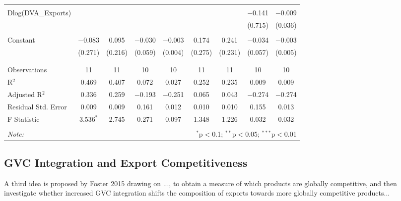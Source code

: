 \documentclass[a4paper]{article}
\begin{document}
\begin{table}[!htbp]
{\begin{tabular}{@{\extracolsep{5pt}}lcccccccc}
  & & & & & & & & \\ 
 Dlog(DVA\_Exports) &  &  &  &  &  &  & $-$0.141 & $-$0.009 \\ 
  &  &  &  &  &  &  & (0.715) & (0.036) \\ 
  & & & & & & & & \\ 
 Constant & $-$0.083 & 0.095 & $-$0.030 & $-$0.003 & 0.174 & 0.241 & $-$0.034 & $-$0.003 \\ 
  & (0.271) & (0.216) & (0.059) & (0.004) & (0.275) & (0.231) & (0.057) & (0.005) \\ 
  & & & & & & & & \\ 
\hline \\[-1.8ex] 
Observations & 11 & 11 & 10 & 10 & 11 & 11 & 10 & 10 \\ 
R$^{2}$ & 0.469 & 0.407 & 0.072 & 0.027 & 0.252 & 0.235 & 0.009 & 0.009 \\ 
Adjusted R$^{2}$ & 0.336 & 0.259 & $-$0.193 & $-$0.251 & 0.065 & 0.043 & $-$0.274 & $-$0.274 \\ 
Residual Std. Error & 0.009 & 0.009 & 0.161 & 0.012 & 0.010 & 0.010 & 0.155 & 0.013 \\ 
F Statistic & 3.536$^{*}$ & 2.745 & 0.271 & 0.097 & 1.348 & 1.226 & 0.032 & 0.032 \\ 
\hline 
\hline \\[-1.8ex] 
\textit{Note:}  & \multicolumn{8}{r}{$^{*}$p$<$0.1; $^{**}$p$<$0.05; $^{***}$p$<$0.01} \\ 
\end{tabular} 
}
\end{table} 
\FloatBarrier



\subsection{GVC Integration and Export Competitiveness}
A third idea is proposed by Foster 2015 drawing on ..., to obtain a measure of which products are globally competitive, and then investigate whether increased GVC integration shifts the composition of exports towards more globally competitive products... 





\newpage


\end{document}
